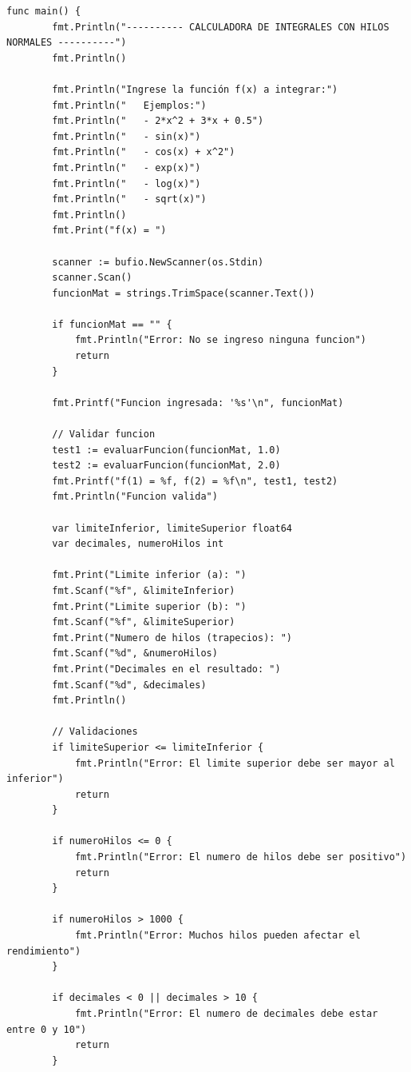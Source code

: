 \begin{lstlisting}[style=go-style, caption={Función Main en Golang}]
    func main() {
        fmt.Println("---------- CALCULADORA DE INTEGRALES CON HILOS NORMALES ----------")
        fmt.Println()
        
        fmt.Println("Ingrese la función f(x) a integrar:")
        fmt.Println("   Ejemplos:")
        fmt.Println("   - 2*x^2 + 3*x + 0.5")
        fmt.Println("   - sin(x)")
        fmt.Println("   - cos(x) + x^2")
        fmt.Println("   - exp(x)")
        fmt.Println("   - log(x)")
        fmt.Println("   - sqrt(x)")
        fmt.Println()
        fmt.Print("f(x) = ")
        
        scanner := bufio.NewScanner(os.Stdin)
        scanner.Scan()
        funcionMat = strings.TrimSpace(scanner.Text())
        
        if funcionMat == "" {
            fmt.Println("Error: No se ingreso ninguna funcion")
            return
        }
        
        fmt.Printf("Funcion ingresada: '%s'\n", funcionMat)
        
        // Validar funcion
        test1 := evaluarFuncion(funcionMat, 1.0)
        test2 := evaluarFuncion(funcionMat, 2.0)
        fmt.Printf("f(1) = %f, f(2) = %f\n", test1, test2)
        fmt.Println("Funcion valida")
        
        var limiteInferior, limiteSuperior float64
        var decimales, numeroHilos int
        
        fmt.Print("Limite inferior (a): ")
        fmt.Scanf("%f", &limiteInferior)
        fmt.Print("Limite superior (b): ")
        fmt.Scanf("%f", &limiteSuperior)
        fmt.Print("Numero de hilos (trapecios): ")
        fmt.Scanf("%d", &numeroHilos)
        fmt.Print("Decimales en el resultado: ")
        fmt.Scanf("%d", &decimales)
        fmt.Println()
        
        // Validaciones
        if limiteSuperior <= limiteInferior {
            fmt.Println("Error: El limite superior debe ser mayor al inferior")
            return
        }
        
        if numeroHilos <= 0 {
            fmt.Println("Error: El numero de hilos debe ser positivo")
            return
        }
        
        if numeroHilos > 1000 {
            fmt.Println("Error: Muchos hilos pueden afectar el rendimiento")
        }
        
        if decimales < 0 || decimales > 10 {
            fmt.Println("Error: El numero de decimales debe estar entre 0 y 10")
            return
        }
        

\end{lstlisting}
